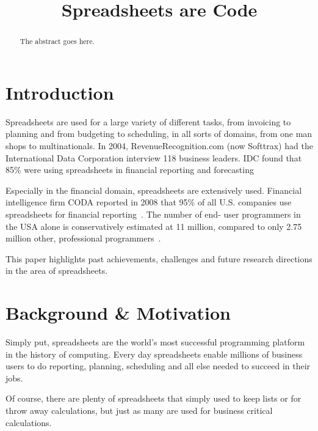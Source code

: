 \documentclass[conference]{IEEEtran}
\begin{document}
\title{Spreadsheets are Code}

\author{
}


\maketitle

\begin{abstract}
The abstract goes here.
\end{abstract}

\IEEEpeerreviewmaketitle

\section{Introduction}
Spreadsheets are used for a large variety of different tasks, from invoicing to planning and from budgeting to scheduling, in all sorts of domains, from one man shops  to multinationals. In 2004, RevenueRecognition.com (now Softtrax) had the International Data Corporation interview 118 business leaders. IDC found that 85\% were using spreadsheets in financial reporting and forecasting~\cite{Panko2008}

Especially in the financial domain, spreadsheets are extensively  used. Financial intelligence firm CODA reported in 2008 that 95\% of all U.S. companies use spreadsheets for financial reporting~\cite{Panko2008}. The number of end- user programmers in the USA alone is conservatively estimated at 11 million, compared to only 2.75 million other, professional programmers~\cite{Scaf2005}.


This paper highlights past achievements, challenges and future research directions in the area of spreadsheets. 


\section{Background \& Motivation}
Simply put, spreadsheets are the world's most successful programming platform in the history of computing. Every day spreadsheets enable millions of business users to do reporting, planning, scheduling and all else needed to succeed in their jobs. 

Of course, there are plenty of spreadsheets that simply used to keep lists or for throw away calculations, but just as many are used for business critical calculations.
\end{document}
